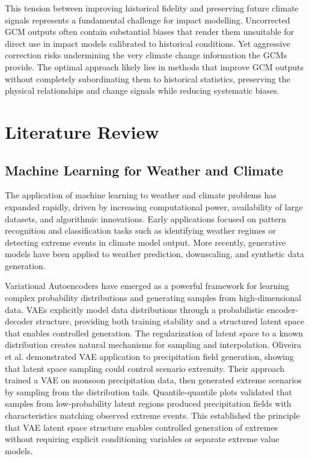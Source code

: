 This tension between improving historical fidelity and preserving future climate signals 
represents a fundamental challenge for impact modelling. Uncorrected GCM outputs often contain 
substantial biases that render them unsuitable for direct use in impact models calibrated to 
historical conditions. Yet aggressive correction risks undermining the very climate change 
information the GCMs provide. The optimal approach likely lies in methods that improve GCM 
outputs without completely subordinating them to historical statistics, preserving the physical 
relationships and change signals while reducing systematic biases.

\chapter{Literature Review}

\section{Machine Learning for Weather and Climate}

The application of machine learning to weather and climate problems has expanded rapidly, 
driven by increasing computational power, availability of large datasets, and algorithmic 
innovations. Early applications focused on pattern recognition and classification tasks such 
as identifying weather regimes or detecting extreme events in climate model output. More 
recently, generative models have been applied to weather prediction, downscaling, and synthetic 
data generation.

Variational Autoencoders have emerged as a powerful framework for learning complex probability 
distributions and generating samples from high-dimensional data. VAEs explicitly model data 
distributions through a probabilistic encoder-decoder structure, providing both training 
stability and a structured latent space that enables controlled generation. The regularization 
of latent space to a known distribution creates natural mechanisms for sampling and 
interpolation. Oliveira et al. \cite{vae-synthesis} demonstrated VAE application to 
precipitation field generation, showing that latent space sampling could control scenario 
extremity. Their approach trained a VAE on monsoon precipitation data, then generated extreme 
scenarios by sampling from the distribution tails. 
Quantile-quantile plots validated that samples from low-probability latent regions produced 
precipitation fields with characteristics matching observed extreme events. This established 
the principle that VAE latent space structure enables controlled generation of extremes without 
requiring explicit conditioning variables or separate extreme value models.

